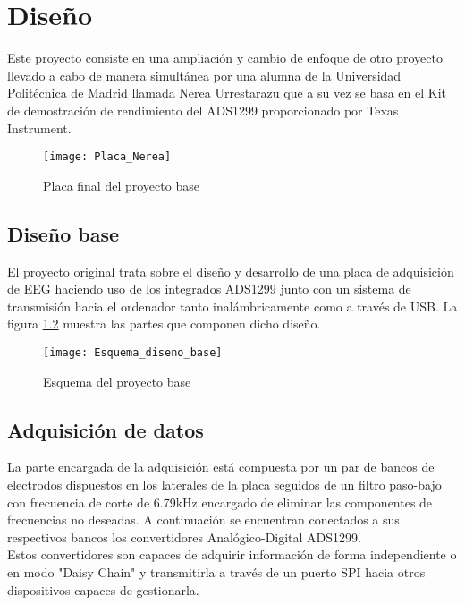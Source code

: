 \chapter{Diseño\label{sec:diseño}}

Este proyecto consiste en una ampliación y cambio de enfoque de otro proyecto llevado a cabo de manera simultánea por una alumna de la Universidad Politécnica de Madrid llamada Nerea Urrestarazu que a su vez se basa en el Kit de demostración de rendimiento del ADS1299 proporcionado por Texas Instrument.

\begin{figure} [H]
    \centering
    \texttt{[image: Placa\_Nerea]}
    \caption{Placa final del proyecto base}
    \label{fig:Placa_base}
\end{figure}

\section{Diseño base\label{sec:Diseno_base_N}}

El proyecto original trata sobre el diseño y desarrollo de una placa de adquisición de EEG haciendo uso de los integrados ADS1299 junto con un sistema de transmisión hacia el ordenador tanto inalámbricamente como a través de USB. La figura \ref{fig:Diseno_base} muestra las partes que componen dicho diseño.

\begin{figure} [H]
    \centering
    \texttt{[image: Esquema\_diseno\_base]}
    \caption{Esquema del proyecto base}
    \label{fig:Diseno_base}
\end{figure}

\section{Adquisición de datos\label{sec:Adquisicion_N}}

La parte encargada de la adquisición está compuesta por un par de bancos de electrodos dispuestos en los laterales de la placa seguidos de un filtro paso-bajo con frecuencia de corte de 6.79kHz encargado de eliminar las componentes de frecuencias no deseadas. A continuación se encuentran conectados a sus respectivos bancos los convertidores Analógico-Digital ADS1299. 
\\Estos convertidores son capaces de adquirir información de forma independiente o en modo "Daisy Chain" y transmitirla a través de un puerto \gls{SPI} hacia otros dispositivos capaces de gestionarla.

